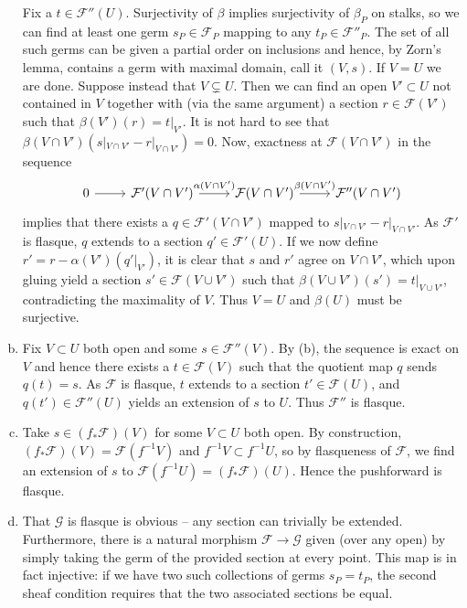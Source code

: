 \documentclass{mathnotes}
\begin{document}
\begin{enumerate}[(a)]
        Fix a $t\in\mathcal{F}''(U)$. Surjectivity of $\beta$ implies surjectivity of $\beta_P$ on stalks, so
        we can find at least one germ $s_P\in\mathcal{F}_P$ mapping to any $t_P\in\mathcal{F}''_P$. The set of all such germs
        can be given a partial order on inclusions and hence, by Zorn's lemma, contains a germ with maximal domain,
        call it $(V,s)$. If $V=U$ we are done. Suppose instead that $V\subsetneq U$. Then we can find an open $V'\subset U$
        not contained in $V$ together with (via the same argument) a section $r\in\mathcal{F}(V')$ such that $\beta(V')(r)=t|_{V'}$.
        It is not hard to see that $\beta(V\cap V')(s|_{V\cap V'}-r|_{V\cap V'})=0$. Now, exactness at $\mathcal{F}(V\cap V')$
        in the sequence
        \begin{equation*}
            \begin{tikzcd}
                0\ar{r} & \mathcal{F}'(V\cap V')\ar{r}{\alpha(V\cap V')} & \mathcal{F}(V\cap V')\ar{r}{\beta(V\cap V')} & \mathcal{F}''(V\cap V')
            \end{tikzcd}
        \end{equation*}
        implies that there exists a $q\in\mathcal{F}'(V\cap V')$ mapped to $s|_{V\cap V'}-r|_{V\cap V'}$. As
        $\mathcal{F'}$ is flasque, $q$ extends to a section $q'\in\mathcal{F}'(U)$. If we now define $r'=r-\alpha(V')(q'|_{V'})$,
        it is clear that $s$ and $r'$ agree on $V\cap V'$, which upon gluing yield a section $s'\in\mathcal{F}(V\cup V')$
        such that $\beta(V\cup V')(s')=t|_{V\cup V'}$, contradicting the maximality of $V$. Thus $V=U$ and $\beta(U)$ must
        be surjective.
    \item Fix $V\subset U$ both open and some $s\in\mathcal{F}''(V)$. By (b), the sequence is exact on $V$ and hence 
        there exists a $t\in\mathcal{F}(V)$ such that the quotient map $q$ sends $q(t)=s$. As $\mathcal{F}$ is flasque,
        $t$ extends to a section $t'\in\mathcal{F}(U)$, and $q(t')\in\mathcal{F}''(U)$ yields an extension of $s$ to $U$.
        Thus $\mathcal{F}''$ is flasque.
    \item Take $s\in(f_*\mathcal{F})(V)$ for some $V\subset U$ both open. By construction, $(f_*\mathcal{F})(V)=\mathcal{F}(f^{-1}V)$
        and $f^{-1}V\subset f^{-1}U$, so by flasqueness of $\mathcal{F}$, we find an extension of $s$ to $\mathcal{F}(f^{-1}U)=(f_*\mathcal{F})(U)$.
        Hence the pushforward is flasque.
    \item That $\mathcal{G}$ is flasque is obvious -- any section can trivially be extended. Furthermore, there is a natural
        morphism $\mathcal{F}\to\mathcal{G}$ given (over any open) by simply taking the germ of the provided section at every point.
        This map is in fact injective: if we have two such collections of germs $s_P=t_P$, the second sheaf condition requires that the
        two associated sections be equal.
\end{enumerate}
\end{document}
